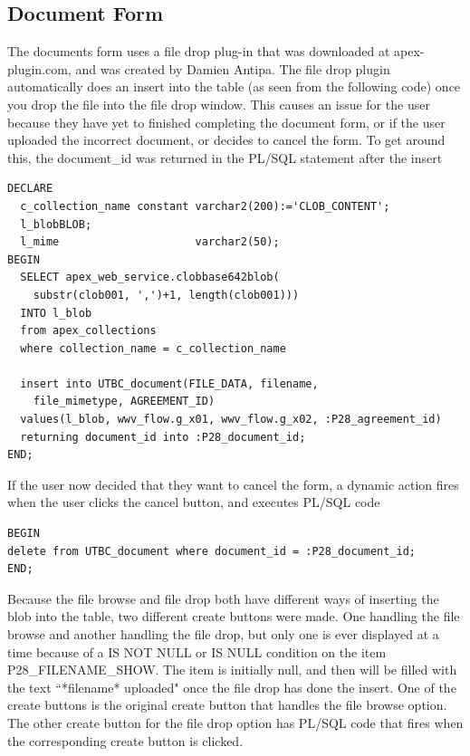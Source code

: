 \documentclass{report}
\begin{document}
\subsection{Document Form}
The documents form uses a file drop plug-in that was downloaded at apex-plugin.com, and was created by Damien Antipa. The file drop plugin automatically does an insert into the table (as seen from the following code) once you drop the file into the file drop window. This causes an issue for the user because they have yet to finished completing the document form, or if the user uploaded the incorrect document, or decides to cancel the form. To get around this, the document\_id was returned in the PL/SQL statement after the insert

\begin{lstlisting}[caption = PL/SQL on filedrop item]
DECLARE
  c_collection_name constant varchar2(200):='CLOB_CONTENT';
  l_blobBLOB;
  l_mime				     varchar2(50);
BEGIN
  SELECT apex_web_service.clobbase642blob(
  	substr(clob001, ',')+1, length(clob001)))
  INTO l_blob
  from apex_collections
  where collection_name = c_collection_name
  
  insert into UTBC_document(FILE_DATA, filename, 
  	file_mimetype, AGREEMENT_ID) 
  values(l_blob, wwv_flow.g_x01, wwv_flow.g_x02, :P28_agreement_id)
  returning document_id into :P28_document_id;
END;
\end{lstlisting}

If the user now decided that they want to cancel the form, a dynamic action fires when the user clicks the cancel button, and executes PL/SQL code

\begin{lstlisting}[caption=close dialog PL/SQL]
BEGIN
delete from UTBC_document where document_id = :P28_document_id;
END;
\end{lstlisting}

Because the file browse and file drop both have different ways of inserting the blob into the table, two different create buttons were made. One handling the file browse and another handling the file drop, but only one is ever displayed at a time because of a IS NOT NULL or IS NULL condition on the item P28\_FILENAME\_SHOW. The item is initially null, and then will be filled with the text ``*filename* uploaded" once the file drop has done the insert. 
One of the create buttons is the original create button that handles the file browse option. The other create button for the file drop option has PL/SQL code that fires when the corresponding create button is clicked. 
\end{document}
